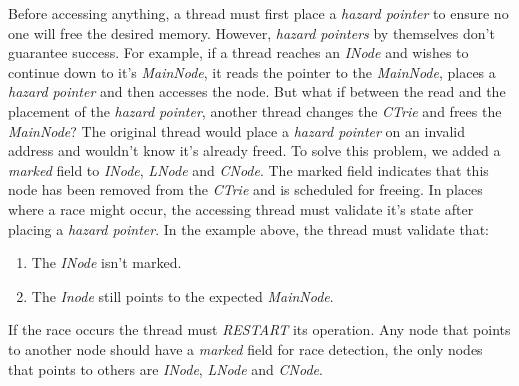 \documentclass[conference]{IEEEtran}
\begin{document}
	Before accessing anything, a thread must first place a \textit{hazard pointer} to ensure no one will free the desired memory. However, \textit{hazard pointers} by themselves don't guarantee success. For example, if a thread reaches an \textit{INode} and wishes to continue down to it's \textit{MainNode}, it reads the pointer to the \textit{MainNode}, places a \textit{hazard pointer} and then accesses the node. But what if between the read and the placement of the \textit{hazard pointer}, another thread changes the \textit{CTrie} and frees the \textit{MainNode}? The original thread would place a \textit{hazard pointer} on an invalid address and wouldn't know it's already freed. To solve this problem, we added a \textit{marked} field to \textit{INode}, \textit{LNode} and \textit{CNode}. The marked field indicates that this node has been removed from the \textit{CTrie} and is scheduled for freeing. In places where a race might occur, the accessing thread must validate it's state after placing a \textit{hazard pointer}. In the example above, the thread must validate that:
	\begin{enumerate}
		\item The \textit{INode} isn't marked.
		\item The \textit{Inode} still points to the expected \textit{MainNode}.		
	\end{enumerate}
	If the race occurs the thread must \textit{RESTART} its operation. Any node that points to another node should have a \textit{marked} field for race detection, the only nodes that points to others are \textit{INode}, \textit{LNode} and \textit{CNode}.
	
\end{document}
